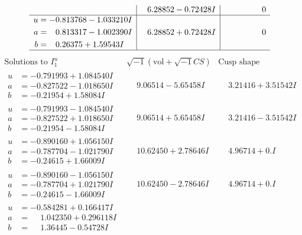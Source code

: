 \documentclass[1p]{elsarticle_modified}
\theoremstyle{definition}
\newcommand{\I}{\sqrt{-1}}
\begin{document}
$$\begin{array}{c|c|c}
 & \phantom{-}6.28852 - 0.72428 I & \phantom{-0.000000 } 0 \\ \hline\begin{aligned}
u &= -0.813768 - 1.033210 I \\
a &= \phantom{-}0.813317 - 1.002390 I \\
b &= \phantom{-}0.26375 + 1.59543 I\end{aligned}
 & \phantom{-}6.28852 + 0.72428 I & \phantom{-0.000000 } 0\\
 \hline 
 \end{array}$$\newpage$$\begin{array}{c|c|c}  
\text{Solutions to }I^u_{1}& \I (\text{vol} + \sqrt{-1}CS) & \text{Cusp shape}\\
 \hline 
\begin{aligned}
u &= -0.791993 + 1.084540 I \\
a &= -0.827522 - 1.018650 I \\
b &= -0.21954 + 1.58084 I\end{aligned}
 & \phantom{-}9.06514 - 5.65458 I & \phantom{-}3.21416 + 3.51542 I \\ \hline\begin{aligned}
u &= -0.791993 - 1.084540 I \\
a &= -0.827522 + 1.018650 I \\
b &= -0.21954 - 1.58084 I\end{aligned}
 & \phantom{-}9.06514 + 5.65458 I & \phantom{-}3.21416 - 3.51542 I \\ \hline\begin{aligned}
u &= -0.890160 + 1.056150 I \\
a &= -0.787704 - 1.021790 I \\
b &= -0.24615 + 1.66009 I\end{aligned}
 & \phantom{-}10.62450 + 2.78646 I & \phantom{-}4.96714 + 0. I\phantom{ +0.000000I} \\ \hline\begin{aligned}
u &= -0.890160 - 1.056150 I \\
a &= -0.787704 + 1.021790 I \\
b &= -0.24615 - 1.66009 I\end{aligned}
 & \phantom{-}10.62450 - 2.78646 I & \phantom{-}4.96714 + 0. I\phantom{ +0.000000I} \\ \hline\begin{aligned}
u &= -0.584281 + 0.166417 I \\
a &= \phantom{-}1.042350 + 0.296118 I \\
b &= \phantom{-}1.36445 - 0.54728 I\end{aligned}

\end{array}$$
\end{document}
